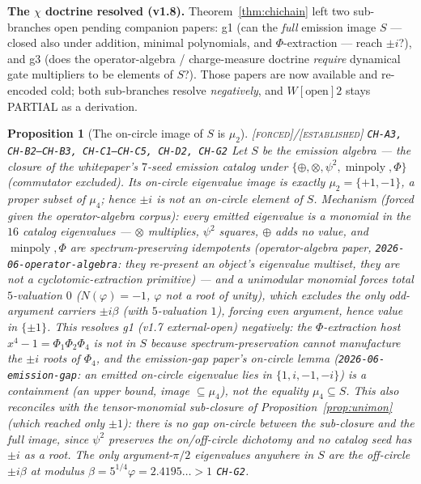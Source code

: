 \documentclass[11pt]{article}
\newcommand{\tagF}{\textcolor{cF}{\textsc{[forced]}}}
\newcommand{\tagE}{\textcolor{cE}{\textsc{[established]}}}
\newcommand{\hx}[1]{\textcolor{cC}{\footnotesize\texttt{#1}}}
\newcommand{\gp}{\varphi}
\theoremstyle{plain}
\newtheorem{proposition}[theorem]{Proposition}
\theoremstyle{definition}
\theoremstyle{remark}
\begin{document}
\smallskip\noindent
\textbf{The $\chi$ doctrine resolved (v1.8).} Theorem~\ref{thm:chichain} left
two sub-branches open pending companion papers: g1 (can the \emph{full}
emission image $S$ --- closed also under addition, minimal polynomials, and
$\Phi$-extraction --- reach $\pm i$?), and g3 (does the operator-algebra /
charge-measure doctrine \emph{require} dynamical gate multipliers to be
elements of $S$?). Those papers are now available and re-encoded cold; both
sub-branches resolve \emph{negatively}, and $W[\text{open}]2$ stays PARTIAL as
a derivation.

\begin{proposition}[The on-circle image of $S$ is $\mu_2$]\label{prop:oncircleimage}\tagF{}/\tagE{} \hx{CH-A3, CH-B2--CH-B3, CH-C1--CH-C5, CH-D2, CH-G2}
Let $S$ be the emission algebra --- the closure of the whitepaper's $7$-seed
emission catalog under $\{\oplus,\otimes,\psi^2,\operatorname{minpoly},\Phi\}$
(commutator excluded). Its on-circle eigenvalue image is \emph{exactly}
$\mu_2=\{+1,-1\}$, a proper subset of $\mu_4$; hence $\pm i$ is \emph{not} an
on-circle element of $S$. Mechanism (forced given the operator-algebra
corpus): every emitted eigenvalue is a monomial in the $16$ catalog
eigenvalues --- $\otimes$ multiplies, $\psi^2$ squares, $\oplus$ adds no value,
and $\operatorname{minpoly},\Phi$ are spectrum-\emph{preserving} idempotents
(operator-algebra paper, \texttt{2026-06-operator-algebra}: they re-present an
object's eigenvalue multiset, they are not a cyclotomic-extraction primitive)
--- and a unimodular monomial forces total $5$-valuation $0$ ($N(\gp)=-1$,
$\gp$ not a root of unity), which excludes the only odd-argument carriers
$\pm i\beta$ (with $5$-valuation $1$), forcing even argument, hence value in
$\{\pm1\}$. This resolves g1 (v1.7 external-open) negatively: the
$\Phi$-extraction host $x^4-1=\Phi_1\Phi_2\Phi_4$ is not in $S$ because
spectrum-preservation cannot manufacture the $\pm i$ roots of $\Phi_4$, and the
emission-gap paper's on-circle lemma (\texttt{2026-06-emission-gap}: an emitted
on-circle eigenvalue lies in $\{1,i,-1,-i\}$) is a \emph{containment} (an upper
bound, image $\subseteq\mu_4$), \emph{not} the equality $\mu_4\subseteq S$.
This also reconciles with the tensor-monomial sub-closure of
Proposition~\ref{prop:unimon} (which reached only $\pm1$): there is no gap
on-circle between the sub-closure and the full image, since $\psi^2$ preserves
the on/off-circle dichotomy and no catalog seed has $\pm i$ as a root. The only
argument-$\pi/2$ eigenvalues anywhere in $S$ are the \emph{off-circle}
$\pm i\beta$ at modulus $\beta=5^{1/4}\gp=2.4195\ldots>1$ \hx{CH-G2}.
\end{proposition}
\end{document}
